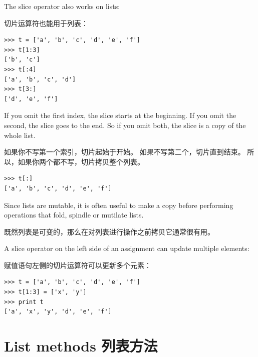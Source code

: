 \documentclass[10pt]{book}
\begin{document}
\begin{CJK}{UTF8}{gbsn}
The slice operator also works on lists:

切片运算符也能用于列表：

\begin{verbatim}
>>> t = ['a', 'b', 'c', 'd', 'e', 'f']
>>> t[1:3]
['b', 'c']
>>> t[:4]
['a', 'b', 'c', 'd']
>>> t[3:]
['d', 'e', 'f']
\end{verbatim}
%
If you omit the first index, the slice starts at the beginning.
If you omit the second, the slice goes to the end.  So if you
omit both, the slice is a copy of the whole list.

如果你不写第一个索引，切片起始于开始。
如果不写第二个，切片直到结束。
所以，如果你两个都不写，切片拷贝整个列表。

\begin{verbatim}
>>> t[:]
['a', 'b', 'c', 'd', 'e', 'f']
\end{verbatim}
%
Since lists are mutable, it is often useful to make a copy
before performing operations that fold, spindle or mutilate
lists.

既然列表是可变的，那么在对列表进行操作之前拷贝它通常很有用。

A slice operator on the left side of an assignment
can update multiple elements:

赋值语句左侧的切片运算符可以更新多个元素：

\begin{verbatim}
>>> t = ['a', 'b', 'c', 'd', 'e', 'f']
>>> t[1:3] = ['x', 'y']
>>> print t
['a', 'x', 'y', 'd', 'e', 'f']
\end{verbatim}
%


%

%


\section{List methods 列表方法}


\end{CJK}
\end{document}
